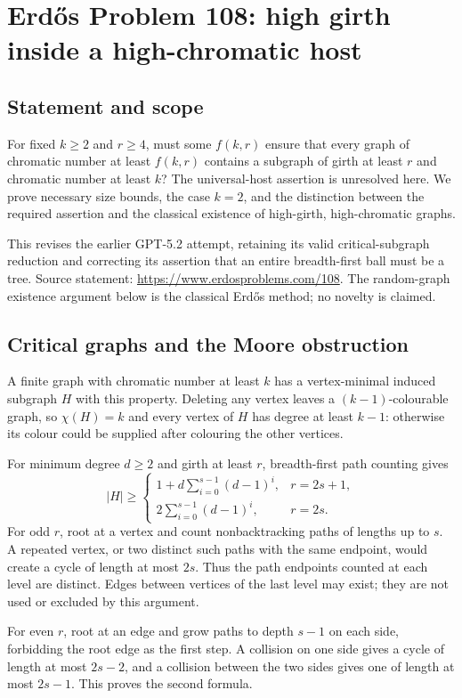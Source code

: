 \section*{Erd\H{o}s Problem 108: high girth inside a high-chromatic host}
\subsection*{Statement and scope}
For fixed $k\ge2$ and $r\ge4$, must some $f(k,r)$ ensure that every graph of chromatic number at least $f(k,r)$ contains a subgraph of girth at least $r$ and chromatic number at least $k$? The universal-host assertion is unresolved here. We prove necessary size bounds, the case $k=2$, and the distinction between the required assertion and the classical existence of high-girth, high-chromatic graphs.

This revises the earlier GPT-5.2 attempt, retaining its valid critical-subgraph reduction and correcting its assertion that an entire breadth-first ball must be a tree. Source statement: \url{https://www.erdosproblems.com/108}. The random-graph existence argument below is the classical Erd\H{o}s method; no novelty is claimed.

\subsection*{Critical graphs and the Moore obstruction}
A finite graph with chromatic number at least $k$ has a vertex-minimal induced subgraph $H$ with this property. Deleting any vertex leaves a $(k-1)$-colourable graph, so $\chi(H)=k$ and every vertex of $H$ has degree at least $k-1$: otherwise its colour could be supplied after colouring the other vertices.

For minimum degree $d\ge2$ and girth at least $r$, breadth-first path counting gives
\[
 |H|\ge
 \begin{cases}
 1+d\sum_{i=0}^{s-1}(d-1)^i,&r=2s+1,\\
 2\sum_{i=0}^{s-1}(d-1)^i,&r=2s.
 \end{cases} \tag{1}
\]
For odd $r$, root at a vertex and count nonbacktracking paths of lengths up to $s$. A repeated vertex, or two distinct such paths with the same endpoint, would create a cycle of length at most $2s$. Thus the path endpoints counted at each level are distinct. Edges between vertices of the last level may exist; they are not used or excluded by this argument.

For even $r$, root at an edge and grow paths to depth $s-1$ on each side, forbidding the root edge as the first step. A collision on one side gives a cycle of length at most $2s-2$, and a collision between the two sides gives one of length at most $2s-1$. This proves the second formula.

